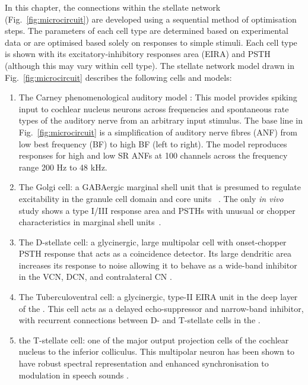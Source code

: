 In this chapter, the connections within the stellate network
(Fig.~\ref{fig:microcircuit}) are developed using a sequential method of
optimisation steps.  The parameters of each cell type are determined based on
experimental data or are optimised based solely on responses to simple stimuli.
Each cell type is shown with its excitatory-inhibitory responses area (EIRA) and
PSTH (although this may vary within cell type).  The stellate network model drawn in
Fig.~\ref{fig:microcircuit} describes the following cells and models:
\begin{enumerate}
\item The Carney phenomenological auditory model
  \citet{ZilanyBruceEtAl:2009}: This model provides spiking input to
  cochlear nucleus neurons across frequencies and spontaneous rate
  types of the auditory nerve from an arbitrary input stimulus. The
  base line in Fig.~\ref{fig:microcircuit} is a simplification of
  auditory nerve fibres (ANF) from low best frequency (BF) to high BF
  (left to right). The model reproduces responses for high and low SR
  ANFs at 100 channels across the frequency range 200 Hz to 48 kHz.
\item The Golgi cell: a GABAergic \VCN marginal shell unit that is presumed to
  regulate excitability in the granule cell domain and core \VCN units
  ~\citep{FerragamoGoldingEtAl:1998}. The only \textit{in vivo} study shows a type
  I/III response area and PSTHs with unusual or chopper characteristics in
  marginal shell units~\citep{GhoshalKim:1997}.
\item The D-stellate cell: a glycinergic, large multipolar cell with
  onset-chopper PSTH response that acts as a coincidence detector. Its
  large dendritic area increases its response to noise allowing it to
  behave as a wide-band inhibitor in the VCN, DCN, and contralateral CN 
  \citep{SmithMassieEtAl:2005,ArnottWallaceEtAl:2004,NeedhamPaolini:2007}.
\item The Tuberculoventral cell: a glycinergic, type-II EIRA unit in the deep
  layer of the \DCN \citep{SpirouDavisEtAl:1999}.  This cell acts as a delayed
  echo-suppressor and narrow-band inhibitor, with recurrent connections between
  D- and T-stellate cells in the \VCN
  \citep{Alibardi:2006,OertelWickesberg:1993,WickesbergWhitlonEtAl:1991}.
\item the T-stellate cell: one of the major output projection cells of the
  cochlear nucleus to the inferior colliculus. This multipolar neuron has been
  shown to have robust spectral representation and enhanced synchronisation to
  modulation in speech sounds
  \citep{BlackburnSachs:1990,KeilsonRichardsEtAl:1997}.
\end{enumerate}

